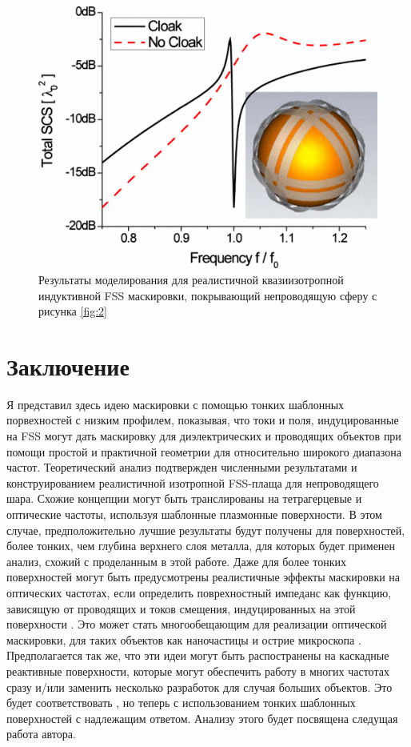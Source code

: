\documentclass[12pt,a4paper]{article}
\begin{document}
\begin{figure}[t]
  \centering
  \includegraphics[height=0.2\paperheight, width=0.4\paperwidth]{6.png}
  \caption{Результаты моделирования для реалистичной квазиизотропной индуктивной FSS 
  маскировки, покрывающий непроводящую сферу с рисунка \ref{fig:2}}
  \label{fig:6}
\end{figure}

\section{Заключение}
Я представил здесь идею маскировки с помощью тонких шаблонных порвехностей с низким профилем,
показывая, что токи и поля, индуцированные на FSS могут дать маскировку для диэлектрических
и проводящих объектов при помощи простой и практичной геометрии для относительно широкого
диапазона частот. Теоретический анализ подтвержден численными результатами и конструированием
реалистичной изотропной FSS-плаща для непроводящего шара. Схожие концепции могут быть 
транслированы на тетрагерцевые и оптические частоты, используя шаблонные плазмонные 
поверхности. В этом случае, предположительно лучшие результаты будут получены для 
поверхностей, более тонких, чем глубина верхнего слоя металла, для которых будет применен
анализ, схожий с проделанным в этой работе. Даже для более тонких поверхностей могут 
быть предусмотрены реалистичные эффекты маскировки на оптических частотах, если определить
поврехностный импеданс как функцию, зависящую от проводящих и токов смещения, индуцированных
на этой поверхности \cite{18}. Это может стать многообещающим для реализации оптической 
маскировки, для таких объектов как наночастицы и острие микроскопа \cite{16,17}. 
Предполагается так же, что эти идеи могут быть распостранены на каскадные реактивные 
поверхности, которые могут обеспечить работу в многих частотах сразу и/или заменить несколько
разработок для случая больших объектов. Это будет соответствовать \cite{9}, но теперь с 
использованием тонких шаблонных поверхностей с надлежащим ответом. Анализу этого будет
посвящена следущая работа автора.
\end{document}
